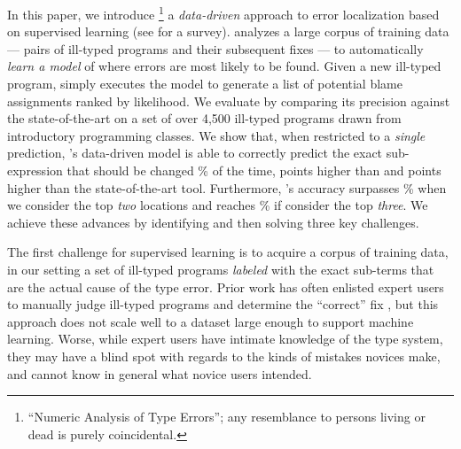 %
In this paper, we introduce \toolname
\footnote{``Numeric Analysis of Type Errors''; any resemblance to persons living or dead is purely coincidental.}
a \emph{data-driven} approach to error
localization based on supervised
learning (see \citealt{Kotsiantis2007-pj} for a survey).
%
\toolname analyzes a large corpus
of training data --- pairs of ill-typed
programs and their subsequent fixes ---
to automatically \emph{learn a model}
of where errors are most likely to
be found.
%
Given a new ill-typed program,
\toolname simply executes the model
to generate a list of potential
blame assignments ranked by likelihood.
%
We evaluate \toolname by comparing its
precision against the state-of-the-art
on a set of over 4,500 ill-typed \ocaml
programs drawn from introductory
programming classes.
%
We show that, when restricted to a
\emph{single} prediction, \toolname's data-driven
model is able to correctly predict
the exact sub-expression that should
be changed \HiddenFhTopOne\% of the time,
\ToolnameWinOcaml points higher than \ocaml and
\ToolnameWinSherrloc points higher than the state-of-the-art
\sherrloc tool.
%
Furthermore, \toolname's accuracy surpasses
\HiddenFhTopTwo\% when we consider the top \emph{two}
locations and reaches \HiddenFhTopThree\% if consider
the top \emph{three}.
%
We achieve these advances by identifying
and then solving three key challenges.

%
The first challenge for supervised learning
is to acquire a corpus of training data, in our setting
a set of ill-typed programs \emph{labeled}
with the exact sub-terms that are the actual
cause of the type error.
%
Prior work has often enlisted expert users
to manually judge ill-typed programs and
determine the ``correct'' fix
\citep[\eg][]{Lerner2007-dt,Loncaric2016-uk},
but this approach does not scale well to
a dataset large enough to support machine
learning.
%
Worse, while expert users have intimate
knowledge of the type system, they may
have a blind spot with regards to the
kinds of mistakes novices make, and
cannot know in general what novice users
intended.

